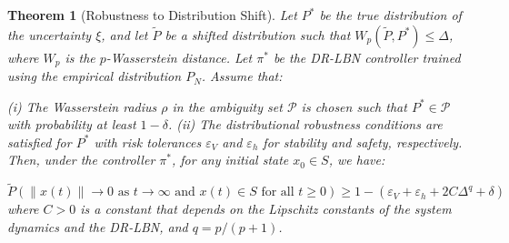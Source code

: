 \documentclass[11pt, oneside]{article}
\newtheorem{theorem}{Theorem}
\begin{document}
\setcounter{theorem}{1}
\begin{theorem}[Robustness to Distribution Shift]
Let $P^*$ be the true distribution of the uncertainty $\xi$, and let $\tilde{P}$ be a shifted distribution such that $W_p(\tilde{P}, P^*) \leq \Delta$, where $W_p$ is the $p$-Wasserstein distance. Let $\pi^*$ be the DR-LBN controller trained using the empirical distribution $P_N$. Assume that:

(i) The Wasserstein radius $\rho$ in the ambiguity set $\mathcal{P}$ is chosen such that $P^* \in \mathcal{P}$ with probability at least $1-\delta$.
(ii) The distributional robustness conditions are satisfied for $P^*$ with risk tolerances $\varepsilon_V$ and $\varepsilon_h$ for stability and safety, respectively. Then, under the controller $\pi^*$, for any initial state $x_0 \in S$, we have:

\begin{equation}
    \tilde{P}(\|x(t)\| \to 0 \text{ as } t \to \infty \text{ and } x(t) \in S \text{ for all } t \geq 0) \geq 1 - (\varepsilon_V + \varepsilon_h + 2C\Delta^q + \delta)
\end{equation}
%
where $C > 0$ is a constant that depends on the Lipschitz constants of the system dynamics and the DR-LBN, and $q = p/(p+1)$.
\end{theorem}
\end{document}
